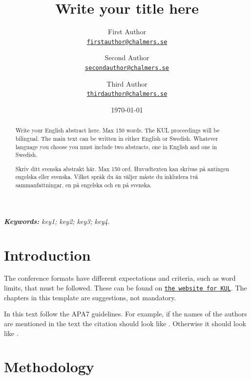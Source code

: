 \documentclass[11pt]{article}
\title{Write your title here}
\author{First Author\\%
    \href{mailto:firstauthor@chalmers.se}{\texttt{firstauthor@chalmers.se}} %
\and Second Author\\%
    \href{mailto:secondauthor@chalmers.se}{\texttt{secondauthor@chalmers.se}} %
\and Third Author\\%
    \href{mailto:thirdauthor@chalmers.se}{\texttt{thirdauthor@chalmers.se}}%
    }
\date{\today}
\begin{document}
\maketitle
{}
\begin{abstract}
Write your English abstract here. Max 150 words. The KUL proceedings will be bilingual. The main text can be written in either English or Swedish. Whatever language you choose you must include two abstracts, one in English and one in Swedish. 

\lipsum[1] 
\end{abstract}

\begin{abstract}
Skriv ditt svenska abstrakt här. Max 150 ord. 
Huvudtexten kan skrivas på antingen engelska eller svenska. Vilket språk du än väljer måste du inkludera två sammanfattningar, en på engelska och en på svenska.

\lipsum[1] 
\end{abstract}


\textit{\textbf{Keywords: }%
key1; key2; key3; key4.} \\ 

\section{Introduction}

The conference formats have different expectations and criteria, such as word limits, that must be followed. These can be found on \href{https://www.chalmers.se/en/conference/kul/submit-contribution/}{\texttt{the website for KUL}}. The chapters in this template are suggestions, not mandatory.  %

In this text follow the APA7 guidelines. For example, if the names of the authors are mentioned in the text the citation should look like \citet{Hardaker2004}. Otherwise it should look like \citep{Chavas2015}. %

\lipsum[2-5] %

\section{Methodology}
\end{document}
